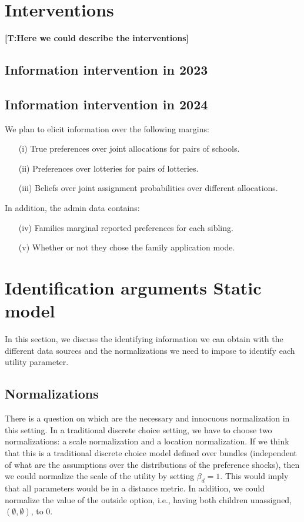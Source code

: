 \documentclass{article}
\newcommand{\tomas}[1]{{\color{red}\textbf{[T:#1]}}}
\begin{document}
\newpage

\section{Interventions}

\tomas{Here we could describe the interventions}

\subsection{Information intervention in 2023}


\subsection{Information intervention in 2024}

We plan to elicit information over the following margins:

\begin{enumerate}
    \item[(i)] True preferences over joint allocations for pairs of schools.
    \item[(ii)] Preferences over lotteries for pairs of lotteries.
    \item[(iii)] Beliefs over joint assignment probabilities over different allocations.
\end{enumerate}

In addition, the admin data contains:
\begin{enumerate}
    \item[(iv)] Families marginal reported preferences for each sibling.
    \item[(v)] Whether or not they chose the family application mode.
\end{enumerate}

\section{Identification arguments Static model}

In this section, we discuss the identifying information we can obtain with the different data sources and the normalizations we need to impose to identify each utility parameter.


\subsection{Normalizations}

There is a question on which are the necessary and innocuous normalization in this setting. In a traditional discrete choice setting, we have to choose two normalizations: a scale normalization and a location normalization. If we think that this is a traditional discrete choice model defined over bundles (independent of what are the assumptions over the distributions of the preference shocks), then we could normalize the scale of the utility by setting $\beta_d = 1$. This would imply that all parameters would be in a distance metric. In addition, we could normalize the value of the outside option, i.e., having both children unassigned, $(\emptyset, \emptyset)$, to 0. 
\end{document}
